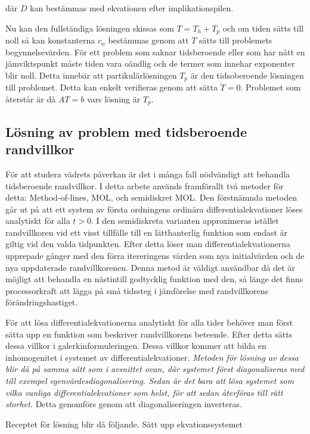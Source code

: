 där $D$ kan bestämmas med ekvationen efter implikationspilen.

Nu kan den fullständiga lösningen skissas som $T = T_h + T_p$ och om
tiden sätts till noll så kan konstanterna $c_n$ bestämmas genom
att $T$ sätts till problemets begynnelsevärden. För ett problem som
saknar tidsberoende eller som har nått en jämviktspunkt måste
tiden vara oändlig och de termer som innehar exponenter blir noll.
Detta innebär att partikulärlösningen $T_p$ är den tidsoberoende lösningen
till problemet. Detta kan enkelt verifieras genom att sätta $\dot{T} = 0$.
Problemet som återstår är då $AT = b$ vars lösning är $T_p$.

\subsection{Lösning av problem med tidsberoende randvillkor}
\label{subsec:mol}

För att studera vädrets påverkan är det i många fall nödvändigt att behandla
tidsberoende randvillkor. I detta arbete används framförallt två metoder för detta:
Method-of-lines, MOL, och semidiskret MOL. Den förstnämnda metoden går ut på att
ett system av första ordningens ordinära differentialekvationer löses analytiskt för
alla $t>0$. I den semidiskreta varianten approximeras istället randvillkoren vid
ett visst tillfälle till en lätthanterlig funktion som endast är giltig vid
den valda tidpunkten. Efter detta löser man differentialekvationerna upprepade gånger
med den förra itereringens värden som nya initialvärden och de nya uppdaterade
randvillkorenen. Denna metod är väldigt användbar då det är möjligt att behandla en nästintill godtycklig
funktion med den, så länge det finns  processorkraft att lägga på små tidssteg i jämförelse med
randvillkorens förändringshastiget.

För att lösa differentialekvationerna analytiskt för alla tider behöver man först
sätta upp en funktion som beskriver randvillkorens beteende. Efter detta sätts
dessa villkor i galerkinformuleringen. Dessa villkor kommer att bilda en inhomogenitet
i systemet av differentialekvationer. \emph{\color{red}Metoden för lösning av dessa blir då på samma sätt som i avsnittet ovan, där systemet först diagonaliseras med till exempel egenvärdesdiagonalisering. Sedan är det bara att lösa systemet som vilka vanliga differentialekvationer som helst, för att sedan återföras till rätt storhet.} Detta genomförs genom att diagonaliseringen inverteras.

Receptet för lösning blir då följande. Sätt upp ekvationssystemet

